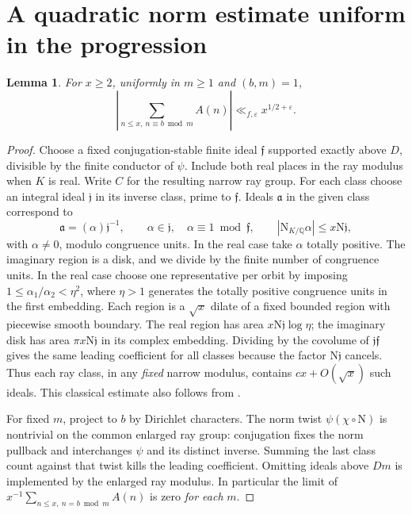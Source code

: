 \documentclass[11pt,a4paper]{article}
\newtheorem{lemma}[theorem]{Lemma}
\newcommand{\N}{\mathrm N}
\newcommand{\Q}{\mathbb Q}
\newcommand{\eps}{\varepsilon}
\begin{document}
\newpage
\section{A quadratic norm estimate uniform in the progression}
\begin{lemma}\label{lem:uniform}
For $x\ge2$, uniformly in $m\ge1$ and $(b,m)=1$,
\[
 \left|\sum_{n\le x,\ n\equiv b\bmod m}A(n)\right|
 \ll_{f,\eps} x^{1/2+\eps}.
\]
\end{lemma}
\begin{proof}
Choose a fixed conjugation-stable finite ideal $\mathfrak f$ supported exactly above $D$, divisible by the finite conductor of $\psi$. Include both real places in the ray modulus when $K$ is real. Write $C$ for the resulting narrow ray group. For each class choose an integral ideal $\mathfrak j$ in its inverse class, prime to $\mathfrak f$. Ideals $\mathfrak a$ in the given class correspond to
\[
 \mathfrak a=(\alpha)\mathfrak j^{-1},\qquad
 \alpha\in\mathfrak j,\quad \alpha\equiv1\bmod\mathfrak f,
 \qquad |\N_{K/\Q}\alpha|\le x\N\mathfrak j,
\]
with $\alpha\ne0$, modulo congruence units. In the real case take $\alpha$ totally positive. The imaginary region is a disk, and we divide by the finite number of congruence units. In the real case choose one representative per orbit by imposing $1\le\alpha_1/\alpha_2<\eta^2$, where $\eta>1$ generates the totally positive congruence units in the first embedding. Each region is a $\sqrt{x}$ dilate of a fixed bounded region with piecewise smooth boundary. The real region has area $x\N\mathfrak j\log\eta$; the imaginary disk has area $\pi x\N\mathfrak j$ in its complex embedding. Dividing by the covolume of $\mathfrak j\mathfrak f$ gives the same leading coefficient for all classes because the factor $\N\mathfrak j$ cancels. Thus each ray class, in any \emph{fixed} narrow modulus, contains $cx+O(\sqrt x)$ such ideals. This classical estimate also follows from \cite[Theorem 1]{grs}.

For fixed $m$, project to $b$ by Dirichlet characters. The norm twist $\psi(\chi\circ\N)$ is nontrivial on the common enlarged ray group: conjugation fixes the norm pullback and interchanges $\psi$ and its distinct inverse. Summing the last class count against that twist kills the leading coefficient. Omitting ideals above $Dm$ is implemented by the enlarged ray modulus. In particular the limit of $x^{-1}\sum_{n\le x,\ n=b\bmod m}A(n)$ is zero \emph{for each} $m$.


\end{proof}
\end{document}
